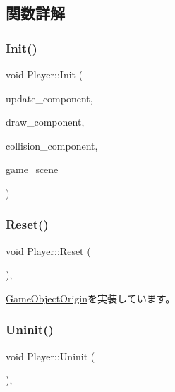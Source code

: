 \subsection{関数詳解}
\mbox{\label{class_player_aec4f49cae0911b3e2cfe02a84e2dc98e}} 
\subsubsection{\texorpdfstring{Init()}{Init()}}
{\footnotesize\ttfamily void Player\+::\+Init (\begin{DoxyParamCaption}\item[{\mbox{\hyperlink{class_update_component}{Update\+Component}} $\ast$}]{update\+\_\+component,  }\item[{\mbox{\hyperlink{class_draw_component}{Draw\+Component}} $\ast$}]{draw\+\_\+component,  }\item[{\mbox{\hyperlink{class_collision_component}{Collision\+Component}} $\ast$}]{collision\+\_\+component,  }\item[{\mbox{\hyperlink{class_game_scene}{Game\+Scene}} $\ast$}]{game\+\_\+scene }\end{DoxyParamCaption})}

\mbox{\label{class_player_a457153d0edd58932e37e1356f5fe5fed}} 
\subsubsection{\texorpdfstring{Reset()}{Reset()}}
{\footnotesize\ttfamily void Player\+::\+Reset (\begin{DoxyParamCaption}{ }\end{DoxyParamCaption})\hspace{0.3cm}{\ttfamily [override]}, {\ttfamily [virtual]}}



\mbox{\hyperlink{class_game_object_origin_af9af378a4fd9028316a6fdb461ed6a10}{Game\+Object\+Origin}}を実装しています。

\mbox{\label{class_player_a7455a83ac23d2f5e0cce0ddd7d92db0c}} 
\subsubsection{\texorpdfstring{Uninit()}{Uninit()}}
{\footnotesize\ttfamily void Player\+::\+Uninit (\begin{DoxyParamCaption}{ }\end{DoxyParamCaption})\hspace{0.3cm}{\ttfamily [override]}, {\ttfamily [virtual]}}



